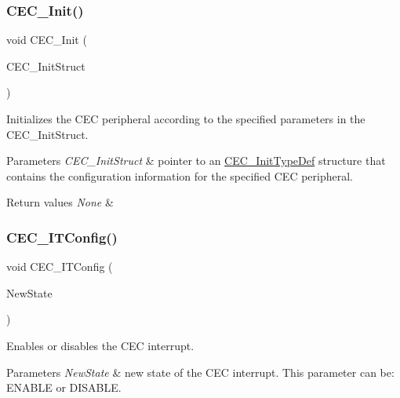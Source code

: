 \subsubsection{\texorpdfstring{CEC\_Init()}{CEC\_Init()}}
{\footnotesize\ttfamily void C\+E\+C\+\_\+\+Init (\begin{DoxyParamCaption}\item[{\mbox{\hyperlink{struct_c_e_c___init_type_def}{C\+E\+C\+\_\+\+Init\+Type\+Def}} $\ast$}]{C\+E\+C\+\_\+\+Init\+Struct }\end{DoxyParamCaption})}



Initializes the C\+EC peripheral according to the specified parameters in the C\+E\+C\+\_\+\+Init\+Struct. 


\begin{DoxyParams}{Parameters}
{\em C\+E\+C\+\_\+\+Init\+Struct} & pointer to an \mbox{\hyperlink{struct_c_e_c___init_type_def}{C\+E\+C\+\_\+\+Init\+Type\+Def}} structure that contains the configuration information for the specified C\+EC peripheral. \\
\hline
\end{DoxyParams}

\begin{DoxyRetVals}{Return values}
{\em None} & \\
\hline
\end{DoxyRetVals}
\mbox{\label{group___c_e_c___exported___functions_ga8be87c514505cf82eb29334f054fc0bc}} 
\subsubsection{\texorpdfstring{CEC\_ITConfig()}{CEC\_ITConfig()}}
{\footnotesize\ttfamily void C\+E\+C\+\_\+\+I\+T\+Config (\begin{DoxyParamCaption}\item[{\mbox{\hyperlink{group___exported__types_gac9a7e9a35d2513ec15c3b537aaa4fba1}{Functional\+State}}}]{New\+State }\end{DoxyParamCaption})}



Enables or disables the C\+EC interrupt. 


\begin{DoxyParams}{Parameters}
{\em New\+State} & new state of the C\+EC interrupt. This parameter can be\+: E\+N\+A\+B\+LE or D\+I\+S\+A\+B\+LE. \\
\hline
\end{DoxyParams}

